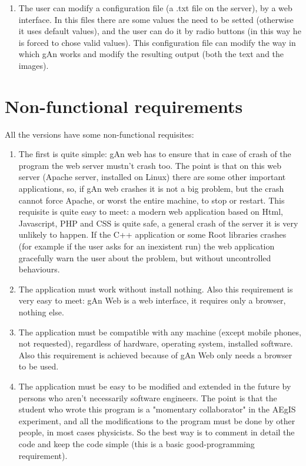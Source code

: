 \begin{enumerate}
\item The user can modify a configuration file (a .txt file on the server), by a web interface. In this files there are some values the need to be setted (otherwise it uses default values), and the user can do it by radio buttons (in this way he is forced to chose valid values). This configuration file can modify the way in which gAn works and modify the resulting output (both the text and the images).   

\end{enumerate}

 
\section{Non-functional requirements}

All the versions have some non-functional requisites:

\begin{enumerate}

\item The first is quite simple: gAn web has to ensure that in case of crash of the program the web server mustn't crash too. The point is that on this web server (Apache server, installed on Linux) there are some other important applications, so, if gAn web crashes it is not a big problem, but the crash cannot force Apache, or worst the entire machine, to stop or restart. 
This requisite is quite easy to meet: a modern web application based on Html, Javascript, PHP and CSS is quite safe, a general crash of the server it is very unlikely to happen. If the C++ application or some Root libraries crashes (for example if the user asks for an inexistent run) the web application gracefully warn the user about the problem, but without uncontrolled behaviours.  

\item The application must work without install nothing. Also this requirement is very easy to meet: gAn Web is a web interface, it requires only a browser, nothing else.

\item The application must be compatible with any machine (except mobile phones, not requested), regardless of hardware, operating system, installed software. Also this requirement is achieved because of gAn Web only needs a browser to be used. 

\item The application must be easy to be modified and extended in the future by persons who aren't necessarily software engineers. The point is that the student who wrote this program is a "momentary collaborator" in the AEgIS experiment, and all the modifications to the program must be done by other people, in most cases physicists. So the best way is to comment in detail the code and keep the code simple (this is a basic good-programming requirement).   


\end{enumerate}

